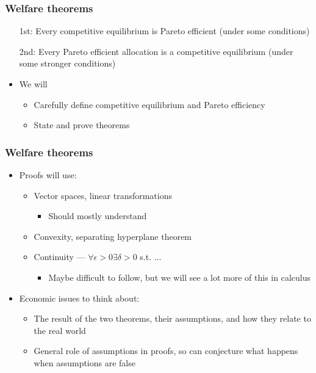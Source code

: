 \documentclass[compress]{beamer}
\begin{document}
\begin{frame}
  \frametitle{Welfare theorems}
  \begin{itemize}
  \item[1st:] Every competitive equilibrium is Pareto efficient (under
    some conditions)
  \item[2nd:] Every Pareto efficient allocation is a competitive
    equilibrium (under some stronger conditions)
  \item We will
    \begin{itemize}
    \item Carefully define competitive equilibrium and Pareto
      efficiency
    \item State and prove theorems
    \end{itemize}
  \end{itemize}
\end{frame}

\begin{frame}
  \frametitle{Welfare theorems}
  \begin{itemize}
  \item Proofs will use:
    \begin{itemize}
    \item Vector spaces, linear transformations
      \begin{itemize}
      \item Should mostly understand
      \end{itemize}
    \item Convexity, separating hyperplane theorem
    \item Continuity --- $\forall \epsilon > 0 \exists \delta > 0$
      s.t. ...
      \begin{itemize}
      \item Maybe difficult to follow, but we will see a lot more of
        this in calculus
      \end{itemize}
    \end{itemize}
  \item Economic issues to think about:
    \begin{itemize}
    \item The result of the two theorems, their assumptions, and how
      they relate to the real world
    \item General role of assumptions in proofs, so can conjecture
      what happens when assumptions are false 
    \end{itemize}
  \end{itemize}
\end{frame}
\end{document}
